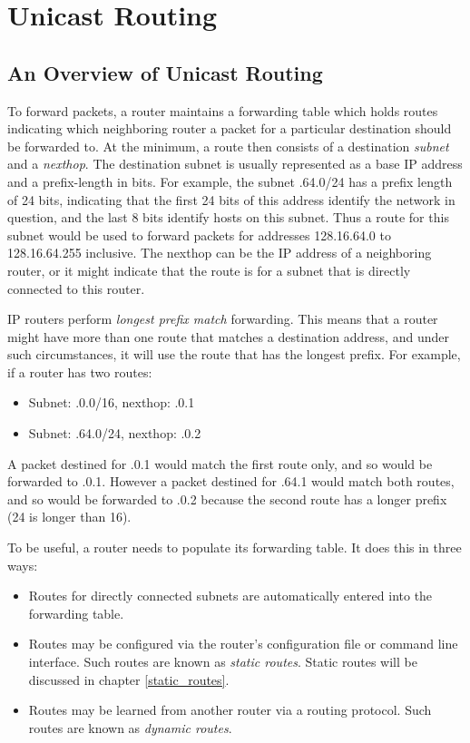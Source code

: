 \chapter{Unicast Routing}

\section{An Overview of Unicast Routing}

To forward packets, a router maintains a forwarding table which holds
routes indicating which neighboring router a packet for a particular
destination should be forwarded to.  At the minimum, a route then
consists of a destination {\it subnet} and a {\it nexthop}.  The destination
subnet is usually represented as a base IP address and a prefix-length
in bits.  For example, the subnet {.64.0/24} has a prefix
length of 24 bits, indicating that the first 24 bits of this address
identify the network in question, and the last 8 bits identify hosts
on this subnet.  Thus a route for this subnet would be used to forward
packets for addresses 128.16.64.0 to 128.16.64.255 inclusive.  The
nexthop can be the IP address of a neighboring router, or it might
indicate that the route is for a subnet that is directly connected to
this router.

IP routers perform {\it longest prefix match} forwarding.  This means
that a router might have more than one route that matches a
destination address, and under such circumstances, it will use the
route that has the longest prefix.   For example, if a router has two routes:
\begin{itemize}
\item Subnet: {.0.0/16}, nexthop: {.0.1}
\item Subnet: {.64.0/24}, nexthop: {.0.2}
\end{itemize}
\noindent A packet destined for {.0.1} would match the first
route only, and so would be forwarded to {.0.1}.  However a
packet destined for {.64.1} would match both routes, and so
would be forwarded to {.0.2} because the second route has a
longer prefix (24 is longer than 16).

To be useful, a router needs to populate its forwarding table.  It
does this in three ways:
\begin{itemize}
\item Routes for directly connected subnets are automatically entered into
the forwarding table.
\item Routes may be configured via the router's configuration file or
command line interface.  Such routes are known as {\it static
routes}. Static routes will be discussed in chapter \ref{static_routes}.
\item Routes may be learned from another router via a routing
protocol.  Such routes are known as {\it dynamic routes}.
\end{itemize}

